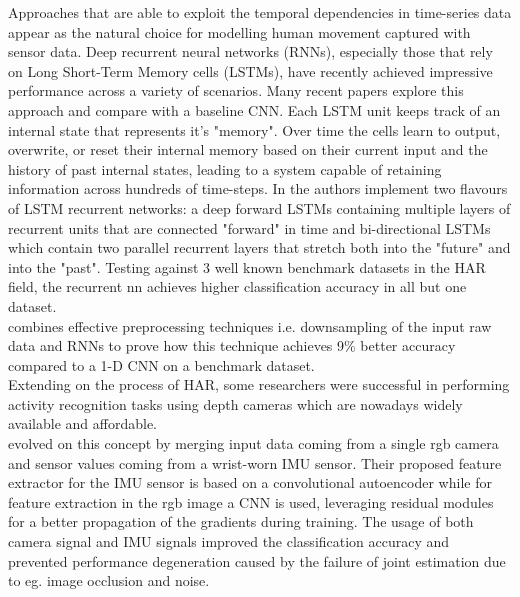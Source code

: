 Approaches that are able to exploit the temporal dependencies in time-series data appear as the natural choice for modelling human movement captured with sensor data. Deep recurrent neural networks (RNNs), especially those that rely on Long Short-Term Memory cells (LSTMs), have recently achieved impressive performance across a variety of scenarios. Many recent papers explore this approach and compare with a baseline CNN. Each LSTM unit keeps track of an internal state that represents it's "memory". Over time the cells learn to output, overwrite, or reset their internal memory based on their current input and the history of past internal states, leading to a system capable of retaining information across hundreds of time-steps. In \cite{nils-2016} the authors implement two flavours of LSTM recurrent networks: a deep forward LSTMs containing multiple layers of recurrent units that are connected "forward" in time and bi-directional LSTMs which contain two parallel recurrent layers that stretch both into the "future" and into the "past". Testing against 3 well known benchmark datasets in the HAR field, the recurrent nn achieves higher classification accuracy in all but one dataset.\\
\cite{Valarezo-2017} combines effective preprocessing techniques i.e. downsampling of the input raw data and RNNs to prove how this technique achieves 9\% better accuracy compared to a 1-D CNN on a benchmark dataset.\\
Extending on the process of HAR, some researchers were successful in performing activity recognition tasks using depth cameras \cite{su-2016, alessandro-2016} which are nowadays widely available and affordable.\\
\cite{2017-mfi-actionrecognition} evolved on this concept by merging input data coming from a single rgb camera and sensor values coming from a wrist-worn IMU sensor. Their proposed feature extractor for the IMU sensor is based on a convolutional autoencoder while for feature extraction in the rgb image a CNN is used, leveraging residual modules for a better propagation of the gradients during training. The usage of both camera signal and IMU signals improved the classification accuracy and prevented performance degeneration caused by the failure of joint estimation due to eg. image occlusion and noise.